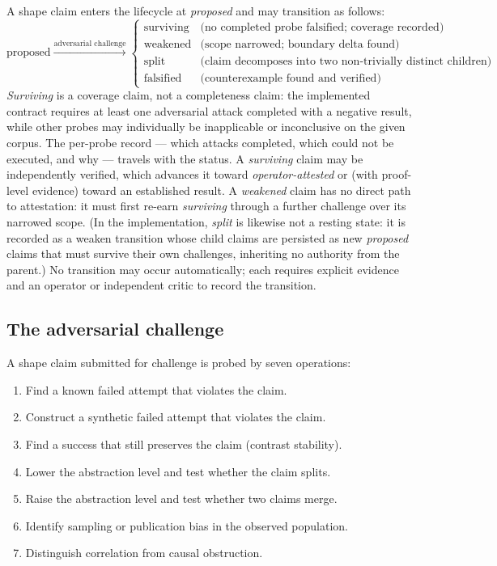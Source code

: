 \documentclass[11pt]{article}
\theoremstyle{gowthm}
\theoremstyle{gowplain}
\begin{document}
A shape claim enters the lifecycle at \emph{proposed} and may transition as
follows:
\[
\text{proposed}
\xrightarrow{\text{adversarial challenge}}
\begin{cases}
  \text{surviving} & \text{(no completed probe falsified; coverage recorded)} \\
  \text{weakened} & \text{(scope narrowed; boundary delta found)} \\
  \text{split} & \text{(claim decomposes into two non-trivially distinct children)} \\
  \text{falsified} & \text{(counterexample found and verified)}
\end{cases}
\]
\emph{Surviving} is a coverage claim, not a completeness claim: the
implemented contract requires at least one adversarial attack completed with
a negative result, while other probes may individually be inapplicable or
inconclusive on the given corpus. The per-probe record --- which attacks
completed, which could not be executed, and why --- travels with the status.
A \emph{surviving} claim may be independently verified,
which advances it toward \emph{operator-attested} or (with proof-level evidence)
toward an established result. A \emph{weakened} claim has no direct path to
attestation: it must first re-earn \emph{surviving} through a further
challenge over its narrowed scope. (In the implementation, \emph{split} is
likewise not a resting state: it is recorded as a weaken transition whose
child claims are persisted as new \emph{proposed} claims that must survive
their own challenges, inheriting no authority from the parent.) No transition
may occur automatically; each
requires explicit evidence and an operator or independent critic to record the
transition.

\subsection{The adversarial challenge}

A shape claim submitted for challenge is probed by seven operations:

\begin{enumerate}[nosep,label=\textbf{C\arabic*.}]
  \item Find a known failed attempt that violates the claim.
  \item Construct a synthetic failed attempt that violates the claim.
  \item Find a success that still preserves the claim (contrast stability).
  \item Lower the abstraction level and test whether the claim splits.
  \item Raise the abstraction level and test whether two claims merge.
  \item Identify sampling or publication bias in the observed population.
  \item Distinguish correlation from causal obstruction.
\end{enumerate}
\end{document}

